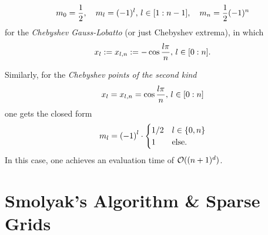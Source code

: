 \documentclass[12pt, oneside]{amsart}
\theoremstyle{definition}
\theoremstyle{remark}
\numberwithin{equation}{section}
\begin{document}
\begin{equation}\label{barycentric_weights_chebyshev}
    m_{0} = \frac{1}{2},\quad m_{l} = (-1)^l,\, l \in \indexset[1]{n-1},\quad m_n = \frac{1}{2}(-1)^n
\end{equation}
for the \emph{Chebyshev Gauss-Lobatto} (or just Chebyshev extrema), in which \begin{equation}\label{ChebyshevGaussLobatto}
    x_l \defn x_{l,n} \defn - \cos\frac{l \pi}{n},\, l \in \indexset[0]{n}.
\end{equation}

Similarly, for the \emph{Chebyshev points of the second kind}
\begin{equation}\label{eq:chebyPts2}
    x_l = x_{l, n} = \cos \frac{l \pi}{n},\, l \in \indexset[0]{n}
\end{equation}
one gets the closed form
\begin{equation}\label{eq:weightsChebyshev}
    m_l = {\left(-1\right)}^l \cdot \begin{cases}
        1/2 &l \in \set{0, n}\\
        1 &\text{else.}
    \end{cases}
\end{equation}
In this case, one achieves an evaluation time of \(\cO((n+1)^d)\).


\section{Smolyak's Algorithm \& Sparse Grids}
\end{document}
